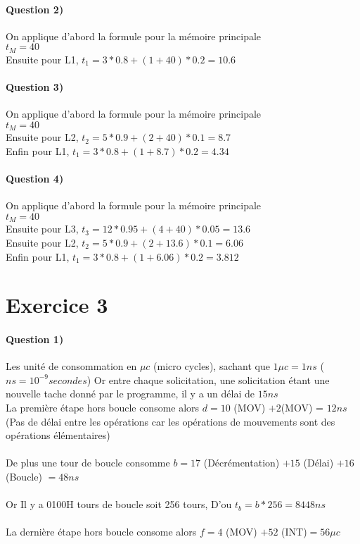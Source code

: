 \documentclass[12pt]{report}
\newcommand{\ns}{\\\indent\indent\vspace{0.25cm}}
\begin{document}
 \paragraph*{Question 2)}
 On applique d'abord la formule pour la mémoire principale\\
 $t_M = 40$\\
 Ensuite pour L1, $t_1 =  3 *0.8 + (1 + 40)*0.2 = \boxed{10.6}$\\

 \paragraph*{Question 3)}
 On applique d'abord la formule pour la mémoire principale\\
 $t_M = 40$\\
 Ensuite pour L2, $t_2 =  5 *0.9 + (2 + 40)*0.1 = \boxed{8.7}$\\
 Enfin pour L1, $t_1 =  3 *0.8 + (1 + 8.7)*0.2 = \boxed{4.34}$\\
 
 \paragraph*{Question 4)}
 On applique d'abord la formule pour la mémoire principale\\
 $t_M = 40$\\
 Ensuite pour L3, $t_3 =  12 *0.95 + (4 + 40)*0.05 = \boxed{13.6}$\\
 Ensuite pour L2, $t_2 =  5 *0.9 + (2 + 13.6)*0.1 = \boxed{6.06}$\\
 Enfin pour L1, $t_1 =  3 *0.8 + (1 + 6.06)*0.2 = \boxed{3.812}$\\
 
\section{Exercice 3}

\paragraph*{Question 1)}

Les unité de consommation en $\mu c$ (micro cycles), sachant que $1 \mu c = 1 ns$ ($ns = 10^{-9} secondes$) 
Or entre chaque solicitation, une solicitation étant une nouvelle tache donné par le programme, il y a un délai de $15 ns$\\

La première étape hors boucle consome alors $d = 10$ (MOV) $ + 2$(MOV)  = \underline{$12 ns$}  (Pas de délai entre les opérations car les opérations de mouvements sont des opérations élémentaires)\\
\ns
De plus une tour de boucle consomme  $b=17$ (Décrémentation) $ +15$ (Délai) $+16$ (Boucle) $=48 ns$ \\
\ns
Or Il y a 0100H tours de boucle soit 256 tours, D'ou $t_b = b *256 =8 448 ns$ \\
\ns
La dernière étape hors boucle consome alors $f= 4$ (MOV) $+52$ (INT)$=56 \mu  c$\\
\end{document}

